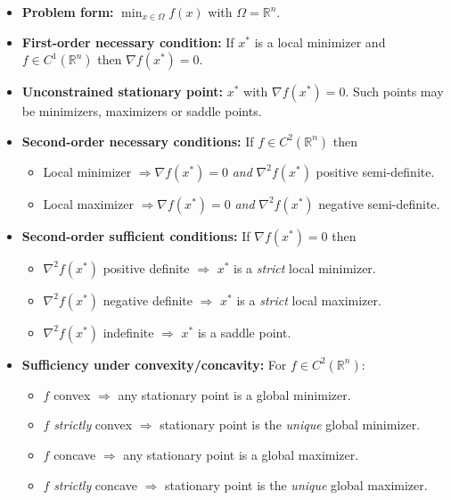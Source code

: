 \documentclass[12pt]{article}
\begin{document}
\begin{itemize}
  \item \textbf{Problem form:} $\displaystyle \min_{x\in\Omega} f(x)$ with $\Omega = \mathbb{R}^n$.
  \item \textbf{First-order necessary condition:} If $x^*$ is a local minimizer and $f\in C^1(\mathbb{R}^n)$ then $\nabla f(x^*) = 0$.
  \item \textbf{Unconstrained stationary point:} $x^*$ with $\nabla f(x^*)=0$. Such points may be minimizers, maximizers or saddle points.
  \item \textbf{Second-order necessary conditions:} If $f\in C^2(\mathbb{R}^n)$ then
  \begin{itemize}
    \item Local minimizer $\Rightarrow \nabla f(x^*)=0$ \emph{and} $\nabla^2 f(x^*)$ positive semi-definite.
    \item Local maximizer $\Rightarrow \nabla f(x^*)=0$ \emph{and} $\nabla^2 f(x^*)$ negative semi-definite.
  \end{itemize}
  \item \textbf{Second-order sufficient conditions:} If $\nabla f(x^*)=0$ then
  \begin{itemize}
    \item $\nabla^2 f(x^*)$ positive definite $\Rightarrow$ $x^*$ is a \emph{strict} local minimizer.
    \item $\nabla^2 f(x^*)$ negative definite $\Rightarrow$ $x^*$ is a \emph{strict} local maximizer.
    \item $\nabla^2 f(x^*)$ indefinite $\Rightarrow$ $x^*$ is a saddle point.
  \end{itemize}
  \item \textbf{Sufficiency under convexity/concavity:} For $f\in C^2(\mathbb{R}^n)$:
  \begin{itemize}
    \item $f$ convex $\Rightarrow$ any stationary point is a global minimizer.
    \item $f$ \emph{strictly} convex $\Rightarrow$ stationary point is the \emph{unique} global minimizer.
    \item $f$ concave $\Rightarrow$ any stationary point is a global maximizer.
    \item $f$ \emph{strictly} concave $\Rightarrow$ stationary point is the \emph{unique} global maximizer.
  \end{itemize}
\end{itemize}

\bigskip
\end{document}
